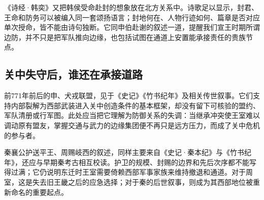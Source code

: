 《诗经·韩奕》又把韩侯受命赴封的想象放在北方关系中。诗歌足以显示，封君、王命和防务可以被编入同一套颂扬语言；封地何在、人物行迹如何、篇章是否对应单次授命，皆不能由诗句独断。它同申伯赴谢的叙述一道，提醒我们宣王时期所谓边防，并不只是把军队推向边缘，也包括试图在通道上安置能承接责任的贵族节点。

\subsection{关中失守后，谁还在承接道路}

前771年前后的申、犬戎联盟，见于《史记》《竹书纪年》及相关传世叙事。它们支持内部裂解为西部武装进入关中创造条件的基本框架，却没有留下可核验的盟约、军队清册或行军图。此处应当把它理解为防御关系的失调：当继承冲突使王室难以调动原有盟友，掌握交通与武力的边缘集团便不再只是远方压力，而成了关中危机的参与者。

秦襄公护送平王、周赐岐西的叙述，同样主要来自《史记·秦本纪》与《竹书纪年》，还应与早期秦考古相互校读。护卫的规模、封赐的边界和先后次序都不能写得过满；它仍说明东迁时王室需要倚赖西部军事家族来维持撤退和通道。对于周室，这是失去旧王畿之后的应急选择；对于秦的后世叙事，则成为其西部地位被重新命名的重要起点。
